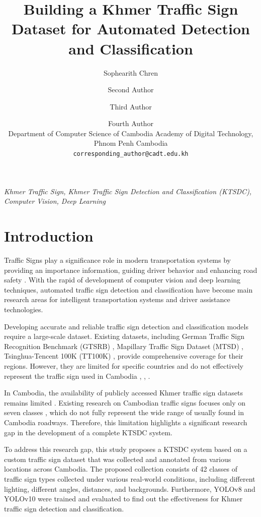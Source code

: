 \documentclass[11pt,a4paper]{article}
\title{Building a Khmer Traffic Sign Dataset for Automated Detection and Classification}
\author{Sophearith Chren\and Second Author\and Third Author\and Fourth Author\\
\small Department of Computer Science of Cambodia Academy of Digital Technology,\\
\small Phnom Penh Cambodia \\
{\tt corresponding\_author@cadt.edu.kh}}
\begin{document}
\maketitle

\medskip
{} \textit{Khmer Traffic Sign, Khmer Traffic Sign Detection and Classification (KTSDC), Computer Vision, Deep Learning}

\section{Introduction}

Traffic Signs play a significance role in modern transportation systems by providing an importance information, guiding driver behavior and enhancing road safety \cite{ertler-2020}\cite{farag-2019}. 
With the rapid of development of computer vision and deep learning techniques, automated traffic sign detection and classification have become main research areas for intelligent transportation systems and driver assistance technologies.

Developing accurate and reliable traffic sign detection and classification models require a large-scale dataset. Existing datasets, including German Traffic Sign Recognition Benchmark (GTSRB) \cite{stallkamp-2012},
Mapillary Traffic Sign Dataset (MTSD) \cite{ertler-2020}, Tsinghua-Tencent 100K (TT100K) \cite{zhu2016}, provide comprehensive coverage for their regions. However, they are limited for specific countries and do not effectively represent 
the traffic sign used in Cambodia \cite{ertler-2020}, \cite{stallkamp-2012}, \cite{zhu2016}. 

In Cambodia, the availability of publicly accessed Khmer traffic sign datasets remains limited \cite{ratitya2025}. Existing research on Cambodian traffic signs focuses only on seven classes \cite{ratitya2025}, which do not fully represent the wide range of
usually found in Cambodia roadways. Therefore, this limitation highlights a significant research gap in the development of a complete KTSDC system.

To address this research gap, this study proposes a KTSDC system based on a custom traffic sign dataset that was collected and annotated from various locations across Cambodia. 
The proposed collection consists of 42 classes of traffic sign types collected under various real-world conditions, including different lighting, different angles, distances, and backgrounds.
Furthermore, YOLOv8 and YOLOv10 were trained and evaluated to find out the effectiveness for Khmer traffic sign detection and classification.
\end{document}
